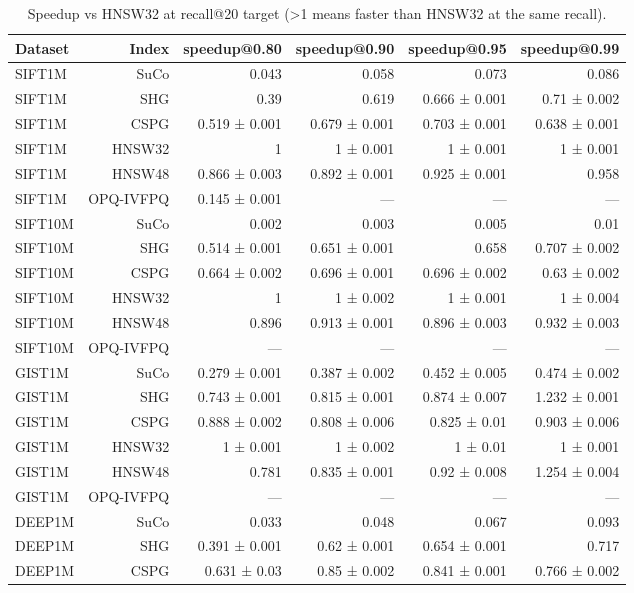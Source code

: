 \begin{table}[t]
\centering
\small
\caption{Speedup vs HNSW32 at recall@20 target (>1 means faster than HNSW32 at the same recall).}
\label{tab:speedup-k20}
\begin{tabular}{lrrrrr}
\toprule
Dataset & Index & speedup@0.80 & speedup@0.90 & speedup@0.95 & speedup@0.99 \\
\midrule
SIFT1M & SuCo & 0.043 & 0.058 & 0.073 & 0.086 \\
SIFT1M & SHG & 0.39 & 0.619 & 0.666 ± 0.001 & 0.71 ± 0.002 \\
SIFT1M & CSPG & 0.519 ± 0.001 & 0.679 ± 0.001 & 0.703 ± 0.001 & 0.638 ± 0.001 \\
SIFT1M & HNSW32 & 1 & 1 ± 0.001 & 1 ± 0.001 & 1 ± 0.001 \\
SIFT1M & HNSW48 & 0.866 ± 0.003 & 0.892 ± 0.001 & 0.925 ± 0.001 & 0.958 \\
SIFT1M & OPQ-IVFPQ & 0.145 ± 0.001 & — & — & — \\
SIFT10M & SuCo & 0.002 & 0.003 & 0.005 & 0.01 \\
SIFT10M & SHG & 0.514 ± 0.001 & 0.651 ± 0.001 & 0.658 & 0.707 ± 0.002 \\
SIFT10M & CSPG & 0.664 ± 0.002 & 0.696 ± 0.001 & 0.696 ± 0.002 & 0.63 ± 0.002 \\
SIFT10M & HNSW32 & 1 & 1 ± 0.002 & 1 ± 0.001 & 1 ± 0.004 \\
SIFT10M & HNSW48 & 0.896 & 0.913 ± 0.001 & 0.896 ± 0.003 & 0.932 ± 0.003 \\
SIFT10M & OPQ-IVFPQ & — & — & — & — \\
GIST1M & SuCo & 0.279 ± 0.001 & 0.387 ± 0.002 & 0.452 ± 0.005 & 0.474 ± 0.002 \\
GIST1M & SHG & 0.743 ± 0.001 & 0.815 ± 0.001 & 0.874 ± 0.007 & 1.232 ± 0.001 \\
GIST1M & CSPG & 0.888 ± 0.002 & 0.808 ± 0.006 & 0.825 ± 0.01 & 0.903 ± 0.006 \\
GIST1M & HNSW32 & 1 ± 0.001 & 1 ± 0.002 & 1 ± 0.01 & 1 ± 0.001 \\
GIST1M & HNSW48 & 0.781 & 0.835 ± 0.001 & 0.92 ± 0.008 & 1.254 ± 0.004 \\
GIST1M & OPQ-IVFPQ & — & — & — & — \\
DEEP1M & SuCo & 0.033 & 0.048 & 0.067 & 0.093 \\
DEEP1M & SHG & 0.391 ± 0.001 & 0.62 ± 0.001 & 0.654 ± 0.001 & 0.717 \\
DEEP1M & CSPG & 0.631 ± 0.03 & 0.85 ± 0.002 & 0.841 ± 0.001 & 0.766 ± 0.002 \\

\end{tabular}
\end{table}
